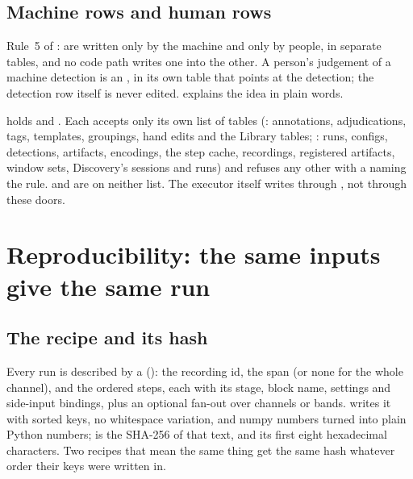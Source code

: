 \subsection{Machine rows and human rows}
Rule~5 of :  are written only by the machine and
 only by people, in separate tables, and no code path writes one into
the other. A person's judgement of a machine detection is an
, in its own table that points at the detection; the detection row
itself is never edited.  explains the idea in plain words.

\begin{underthehood}
 holds  and
. Each accepts only its own list of tables
(: annotations, adjudications, tags, templates, groupings, hand edits and the
 Library tables; : runs, configs, detections, artifacts,
encodings, the step cache, recordings, registered artifacts, window sets, Discovery's sessions and
runs) and refuses any other with a  naming the rule.  and
 are on neither list. The executor itself writes  through
, not through these doors.
\end{underthehood}

\section{Reproducibility: the same inputs give the same run}\label{sec:architecture-reproducibility}
\subsection{The recipe and its hash}
Every run is described by a  (): the recording id,
the span (or none for the whole channel), and the ordered steps, each with its stage, block name,
settings and side-input bindings, plus an optional fan-out over channels or bands.
 writes it with sorted keys, no whitespace variation, and numpy numbers
turned into plain Python numbers;  is the SHA-256 of that text, and
 its first eight hexadecimal characters. Two recipes that mean the same thing get
the same hash whatever order their keys were written in.

